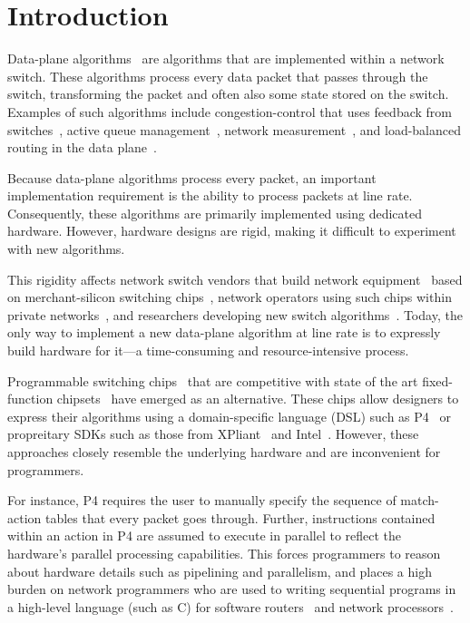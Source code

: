 \section{Introduction}
\label{s:intro}

Data-plane algorithms~\cite{cestan} are algorithms that are implemented within
a network switch. These algorithms process every data packet that passes
through the switch, transforming the packet and often also some state stored on
the switch.  Examples of such algorithms include congestion-control that uses
feedback from switches~\cite{xcp, rcp, pdq, dctcp}, active queue
management~\cite{codel}, network measurement~\cite{opensketch, bitmap_george,
elephant_george}, and load-balanced routing in the data plane~\cite{conga}.

Because data-plane algorithms process every packet, an important implementation
requirement is the ability to process packets at line rate.  Consequently,
these algorithms are primarily implemented using dedicated hardware. However,
hardware designs are rigid, making it difficult to experiment with new
algorithms.

This rigidity affects network switch vendors that build network
equipment~\cite{cisco_nexus, dell_force10, arista_7050} based on
merchant-silicon switching chips~\cite{trident, tomahawk, mellanox}, network
operators using such chips within private networks~\cite{google,facebook,vl2},
and researchers developing new switch algorithms~\cite{xcp, codel, d3, detail,
pdq}. Today, the only way to implement a new data-plane algorithm at line rate
is to expressly build hardware for it---a time-consuming and resource-intensive
process.

Programmable switching chips~\cite{flexpipe, xpliant, rmt} that are competitive
with state of the art fixed-function chipsets~\cite{trident, tomahawk,
mellanox} have emerged as an alternative.  These chips allow designers to
express their algorithms using a domain-specific language (DSL) such as
P4~\cite{p4} or propreitary SDKs such as those from XPliant~\cite{xpliant_sdk,
xpliant_sdk2} and Intel~\cite{intel_sdk}.  However, these approaches closely
resemble the underlying hardware and are inconvenient for programmers.

For instance, P4 requires the user to manually specify the sequence of
match-action tables that every packet goes through. Further, instructions
contained within an action in P4 are assumed to execute in parallel to reflect
the hardware's parallel processing capabilities. This forces programmers to
reason about hardware details such as pipelining and parallelism, and places a
high burden on network programmers who are used to writing sequential programs
in a high-level language (such as C) for software routers~\cite{click} and
network processors~\cite{ixp4xx, ixp2800}.

